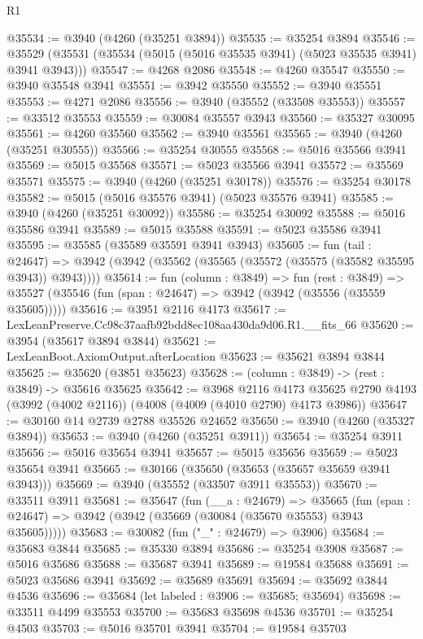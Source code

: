 \begin{lexlean}{R1}
\begin{coremodule}
@35534 := @3940 (@4260 (@35251 @3894))
@35535 := @35254 @3894
@35546 := @35529 (@35531 (@35534 (@5015 (@5016 @35535 @3941) (@5023 @35535 @3941) @3941 @3943)))
@35547 := @4268 @2086
@35548 := @4260 @35547
@35550 := @3940 @35548 @3941
@35551 := @3942 @35550
@35552 := @3940 @35551
@35553 := @4271 @2086
@35556 := @3940 (@35552 (@33508 @35553))
@35557 := @33512 @35553
@35559 := @30084 @35557 @3943
@35560 := @35327 @30095
@35561 := @4260 @35560
@35562 := @3940 @35561
@35565 := @3940 (@4260 (@35251 @30555))
@35566 := @35254 @30555
@35568 := @5016 @35566 @3941
@35569 := @5015 @35568
@35571 := @5023 @35566 @3941
@35572 := @35569 @35571
@35575 := @3940 (@4260 (@35251 @30178))
@35576 := @35254 @30178
@35582 := @5015 (@5016 @35576 @3941) (@5023 @35576 @3941)
@35585 := @3940 (@4260 (@35251 @30092))
@35586 := @35254 @30092
@35588 := @5016 @35586 @3941
@35589 := @5015 @35588
@35591 := @5023 @35586 @3941
@35595 := @35585 (@35589 @35591 @3941 @3943)
@35605 := fun (tail : @24647) =>
  @3942 (@3942 (@35562 (@35565 (@35572 (@35575 (@35582 @35595 @3943)) @3943))))
@35614 := fun (column : @3849) =>
  fun (rest : @3849) =>
  @35527 (@35546 (fun (span : @24647) => @3942 (@3942 (@35556 (@35559 @35605)))))
@35616 := @3951 @2116 @4173
@35617 := LexLeanPreserve.Cc98c37aafb92bdd8ec108aa430da9d06.R1.__fits_66
@35620 := @3954 (@35617 @3894 @3844)
@35621 := LexLeanBoot.AxiomOutput.afterLocation
@35623 := @35621 @3894 @3844
@35625 := @35620 (@3851 @35623)
@35628 := (column : @3849) -> (rest : @3849) -> @35616 @35625
@35642 := @3968
    @2116
    @4173
    @35625
    @2790
    @4193
    (@3992 (@4002 @2116))
    (@4008 (@4009 (@4010 @2790) @4173 @3986))
@35647 := @30160 @14 @2739 @2788 @35526 @24652
@35650 := @3940 (@4260 (@35327 @3894))
@35653 := @3940 (@4260 (@35251 @3911))
@35654 := @35254 @3911
@35656 := @5016 @35654 @3941
@35657 := @5015 @35656
@35659 := @5023 @35654 @3941
@35665 := @30166 (@35650 (@35653 (@35657 @35659 @3941 @3943)))
@35669 := @3940 (@35552 (@33507 @3911 @35553))
@35670 := @33511 @3911
@35681 := @35647
    (fun (__a : @24679) =>
    @35665 (fun (span : @24647) => @3942 (@3942 (@35669 (@30084 (@35670 @35553) @3943 @35605)))))
@35683 := @30082 (fun ("_" : @24679) => @3906)
@35684 := @35683 @3844
@35685 := @35330 @3894
@35686 := @35254 @3908
@35687 := @5016 @35686
@35688 := @35687 @3941
@35689 := @19584 @35688
@35691 := @5023 @35686 @3941
@35692 := @35689 @35691
@35694 := @35692 @3844 @4536
@35696 := @35684 (let labeled : @3906 := @35685; @35694)
@35698 := @33511 @4499 @35553
@35700 := @35683 @35698 @4536
@35701 := @35254 @4503
@35703 := @5016 @35701 @3941
@35704 := @19584 @35703

\end{coremodule}
\end{lexlean}
